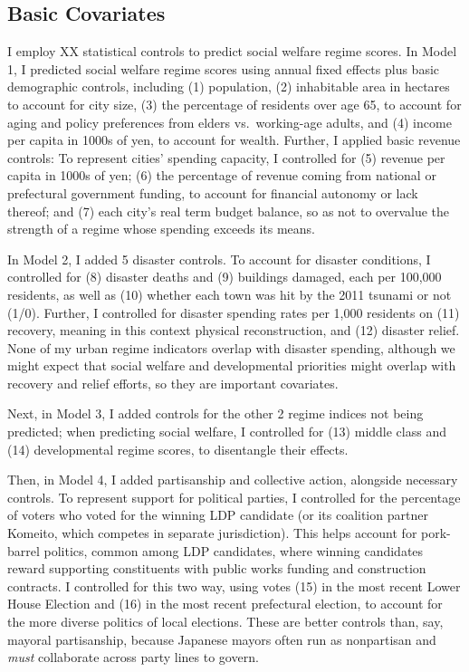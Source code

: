 \documentclass[preprint, 3p,
authoryear]{elsarticle} %
\begin{document}
\hypertarget{basic-covariates}{%
\subsection{Basic Covariates}\label{basic-covariates}}

I employ XX statistical controls to predict social welfare regime
scores. In Model 1, I predicted social welfare regime scores using
annual fixed effects plus basic demographic controls, including (1)
population, (2) inhabitable area in hectares to account for city size,
(3) the percentage of residents over age 65, to account for aging and
policy preferences from elders vs.~working-age adults, and (4) income
per capita in 1000s of yen, to account for wealth. Further, I applied
basic revenue controls: To represent cities' spending capacity, I
controlled for (5) revenue per capita in 1000s of yen; (6) the
percentage of revenue coming from national or prefectural government
funding, to account for financial autonomy or lack thereof; and (7) each
city's real term budget balance, so as not to overvalue the strength of
a regime whose spending exceeds its means.

In Model 2, I added 5 disaster controls. To account for disaster
conditions, I controlled for (8) disaster deaths and (9) buildings
damaged, each per 100,000 residents, as well as (10) whether each town
was hit by the 2011 tsunami or not (1/0). Further, I controlled for
disaster spending rates per 1,000 residents on (11) recovery, meaning in
this context physical reconstruction, and (12) disaster relief. None of
my urban regime indicators overlap with disaster spending, although we
might expect that social welfare and developmental priorities might
overlap with recovery and relief efforts, so they are important
covariates.

Next, in Model 3, I added controls for the other 2 regime indices not
being predicted; when predicting social welfare, I controlled for (13)
middle class and (14) developmental regime scores, to disentangle their
effects.

Then, in Model 4, I added partisanship and collective action, alongside
necessary controls. To represent support for political parties, I
controlled for the percentage of voters who voted for the winning LDP
candidate (or its coalition partner Komeito, which competes in separate
jurisdiction). This helps account for pork-barrel politics, common among
LDP candidates, where winning candidates reward supporting constituents
with public works funding and construction contracts. I controlled for
this two way, using votes (15) in the most recent Lower House Election
and (16) in the most recent prefectural election, to account for the
more diverse politics of local elections. These are better controls
than, say, mayoral partisanship, because Japanese mayors often run as
nonpartisan and \emph{must} collaborate across party lines to govern.
\end{document}
